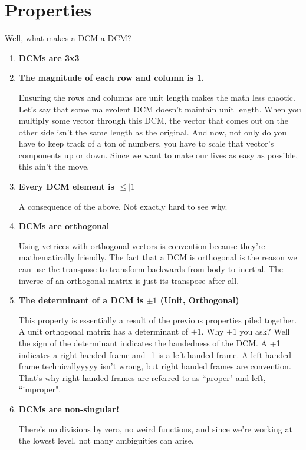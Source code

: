 \documentclass[a4paper,14pt]{extreport}
\begin{document}
\section{Properties}
Well, what makes a DCM a DCM?
\begin{enumerate}
\item{\textbf{DCMs are 3x3}}

\item{\textbf{The magnitude of each row and column is 1.}}

Ensuring the rows and columns are unit length makes the math less chaotic. Let's say that some malevolent DCM doesn't maintain unit length. When you multiply some vector through this DCM, the vector that comes out on the other side isn't the same length as the original. And now, not only do you have to keep track of a ton of numbers, you have to scale that vector's components up or down. Since we want to make our lives as easy as possible, this ain't the move.

\item{\textbf{Every DCM element is $\leq |1|$}}

A consequence of the above. Not exactly hard to see why.

\item{\textbf{DCMs are orthogonal}}

Using vetrices with orthogonal vectors is convention because they're mathematically friendly. The fact that a DCM is orthogonal is the reason we can use the transpose to transform backwards from body to inertial. The inverse of an orthogonal matrix is just its transpose after all.

\item{\textbf{The determinant of a DCM is $\pm 1$ (Unit, Orthogonal)}}

This property is essentially a result of the previous properties piled together. A unit orthogonal matrix has a determinant of $\pm 1$. Why $\pm 1$ you ask? Well the sign of the determinant indicates the handedness of the DCM. A +1 indicates a right handed frame and -1 is a left handed frame. A left handed frame technicallyyyyy isn't wrong, but right handed frames are convention. That's why right handed frames are referred to as ``proper" and left, ``improper".

\item{\textbf{DCMs are non-singular!}}

There's no divisions by zero, no weird functions, and since we're working at the lowest level, not many ambiguities can arise.
\end{enumerate}
\end{document}
